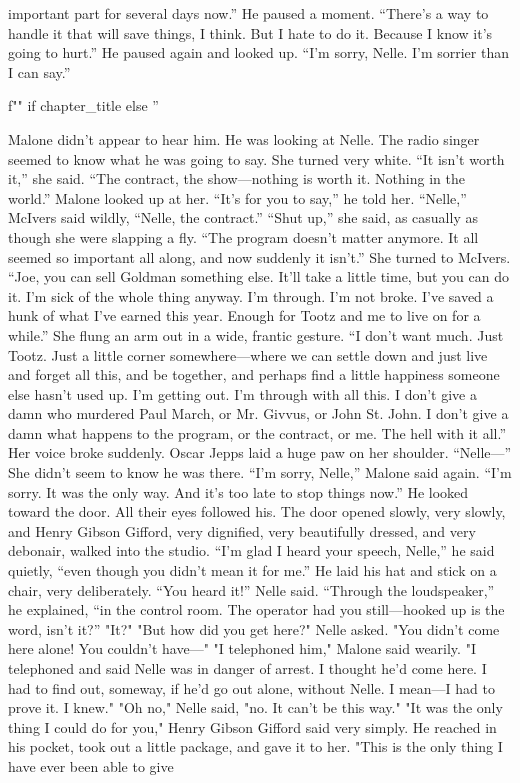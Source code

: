 \documentclass{novel}
\begin{document}
important part for several days now.” He paused a moment. “There’s a way to handle it that will save things, I think. But I hate to do it. Because I know it’s going to hurt.” He paused again and looked up. “I’m sorry, Nelle. I’m sorrier than I can say.”

\begin{ChapterStart}
\vspace{3\nbs}
f"" if chapter_title else ''
\end{ChapterStart}

Malone didn’t appear to hear him. He was looking at Nelle. The radio singer seemed to know what he was going to say. She turned very white. “It isn’t worth it,” she said. “The contract, the show—nothing is worth it. Nothing in the world.” Malone looked up at her. “It’s for you to say,” he told her. “Nelle,” McIvers said wildly, “Nelle, the contract.” “Shut up,” she said, as casually as though she were slapping a fly. “The program doesn’t matter anymore. It all seemed so important all along, and now suddenly it isn’t.” She turned to McIvers. “Joe, you can sell Goldman something else. It’ll take a little time, but you can do it. I'm sick of the whole thing anyway. I’m through. I’m not broke. I've saved a hunk of what I’ve earned this year. Enough for Tootz and me to live on for a while.” She flung an arm out in a wide, frantic gesture. “I don’t want much. Just Tootz. Just a little corner somewhere—where we can settle down and just live and forget all this, and be together, and perhaps find a little happiness someone else hasn’t used up. I’m getting out. I’m through with all this. I don’t give a damn who murdered Paul March, or Mr. Givvus, or John St. John. I don’t give a damn what happens to the program, or the contract, or me. The hell with it all.” Her voice broke suddenly. Oscar Jepps laid a huge paw on her shoulder. “Nelle—” She didn’t seem to know he was there. “I’m sorry, Nelle,” Malone said again. “I’m sorry. It was the only way. And it’s too late to stop things now.” He looked toward the door. All their eyes followed his. The door opened slowly, very slowly, and Henry Gibson Gifford, very dignified, very beautifully dressed, and very debonair, walked into the studio. “I’m glad I heard your speech, Nelle,” he said quietly, “even though you didn’t mean it for me.” He laid his hat and stick on a chair, very deliberately. “You heard it!” Nelle said. “Through the loudspeaker,” he explained, “in the control room. The operator had you still—hooked up is the word, isn’t it?” "It?" "But how did you get here?" Nelle asked. "You didn’t come here alone! You couldn’t have—" "I telephoned him," Malone said wearily. "I telephoned and said Nelle was in danger of arrest. I thought he’d come here. I had to find out, someway, if he’d go out alone, without Nelle. I mean—I had to prove it. I knew." "Oh no," Nelle said, "no. It can’t be this way." "It was the only thing I could do for you," Henry Gibson Gifford said very simply. He reached in his pocket, took out a little package, and gave it to her. "This is the only thing I have ever been able to give 
\end{document}
